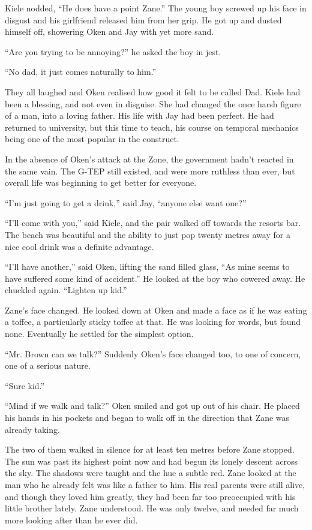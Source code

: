 Kiele nodded, ``He does have a point Zane.''  The young boy screwed up his face in disgust and his girlfriend released him from her grip.  He got up and dusted himself off, showering Oken and Jay with yet more sand.

``Are you trying to be annoying?'' he asked the boy in jest.

``No dad, it just comes naturally to him.''

They all laughed and Oken realised how good it felt to be called Dad.  Kiele had been a blessing, and not even in disguise.  She had changed the once harsh figure of a man, into a loving father.  His life with Jay had been perfect.  He had returned to university, but this time to teach, his course on temporal mechanics being one of the most popular in the construct.

In the absence of Oken's attack at the Zone, the government hadn't reacted in the same vain.  The G-TEP still existed, and were more ruthless than ever, but overall life was beginning to get better for everyone.

``I'm just going to get a drink,'' said Jay, ``anyone else want one?''

``I'll come with you,'' said Kiele, and the pair walked off towards the resorts bar.  The beach was beautiful and the ability to just pop twenty metres away for a nice cool drink was a definite advantage.

``I'll have another,'' said Oken, lifting the sand filled glass, ``As mine seems to have suffered some kind of accident.''  He looked at the boy who cowered away.  He chuckled again.  ``Lighten up kid.''  

Zane's face changed.  He looked down at Oken and made a face as if he was eating a toffee, a particularly sticky toffee at that.  He was looking for words, but found none.  Eventually he settled for the simplest option.

``Mr. Brown can we talk?''  Suddenly Oken's face changed too, to one of concern, one of a serious nature.

``Sure kid.''

``Mind if we walk and talk?''  Oken smiled and got up out of his chair.  He placed his hands in his pockets and began to walk off in the direction that Zane was already taking.  

The two of them walked in silence for at least ten metres before Zane stopped.  The sun was past its highest point now and had begun its lonely descent across the sky.  The shadows were taught and the hue a subtle red.  Zane looked at the man who he already felt was like a father to him.  His real parents were still alive, and though they loved him greatly, they had been far too preoccupied with his little brother lately.  Zane understood.  He was only twelve, and needed far much more looking after than he ever did.

